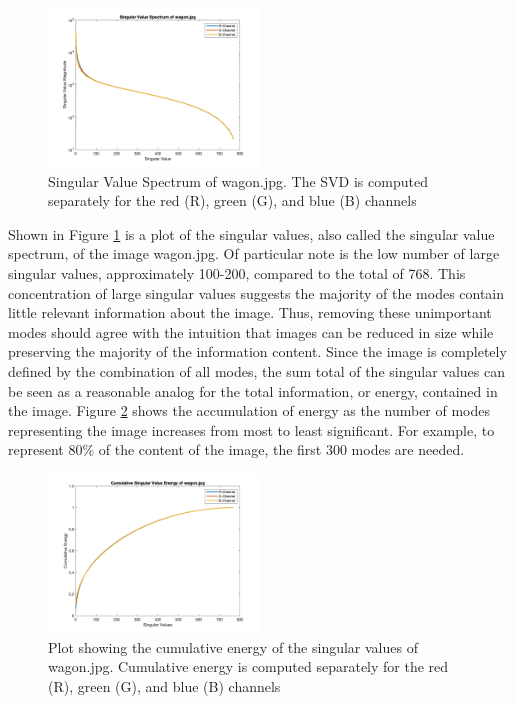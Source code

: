 \documentclass[conference]{IEEEtran}
\begin{document}
    \begin{figure}[t]
    \includegraphics[width=0.5\textwidth]{svals_wagon_rgb}
    \caption{Singular Value Spectrum of wagon.jpg. The SVD is computed separately for the red (R), green (G), and blue (B) channels}
    \label{fig:svalplot}
    \end{figure}
    
    Shown in Figure \ref{fig:svalplot} is a plot of the singular values, also called the singular value spectrum, of the image wagon.jpg. Of particular note is the low number of large singular values, approximately 100-200, compared to the total of 768. This concentration of large singular values suggests the majority of the modes contain little relevant information about the image. Thus, removing these unimportant modes should agree with the intuition that images can be reduced in size while preserving the majority of the information content. Since the image is completely defined by the combination of all modes, the sum total of the singular values can be seen as a reasonable analog for the total information, or energy, contained in the image. Figure \ref{fig:svalenergyplot} shows the accumulation of energy as the number of modes representing the image increases from most to least significant. For example, to represent 80\% of the content of the image, the first 300 modes are needed.

    \begin{figure}[t]
    \includegraphics[width=0.5\textwidth]{sv_energy_wagon_rgb}
    \caption{Plot showing the cumulative energy of the singular values of wagon.jpg. Cumulative energy is computed separately for the red (R), green (G), and blue (B) channels}
    \label{fig:svalenergyplot}
    \end{figure}
    
\end{document}
